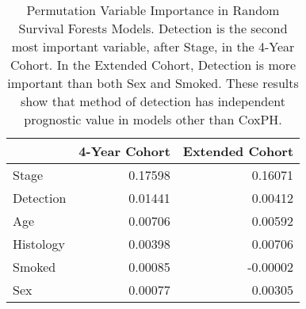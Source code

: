 \begin{table}

\caption{\label{tab:unnamed-chunk-29}Permutation Variable Importance in Random Survival Forests Models. Detection is the second most important variable, after Stage, in the 4-Year Cohort. In the Extended Cohort, Detection is more important than both Sex and Smoked. These results show that method of detection has independent prognostic value in models other than CoxPH.\label{tab:varimp}}
\centering
\begin{tabular}[t]{lrr}
\toprule
  & 4-Year Cohort & Extended Cohort\\
\midrule
Stage & 0.17598 & 0.16071\\
Detection & 0.01441 & 0.00412\\
Age & 0.00706 & 0.00592\\
Histology & 0.00398 & 0.00706\\
Smoked & 0.00085 & -0.00002\\
\addlinespace
Sex & 0.00077 & 0.00305\\
\bottomrule
\end{tabular}
\end{table}
